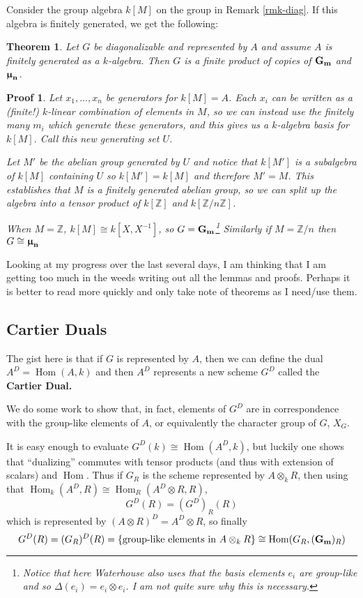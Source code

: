 \documentclass[12pt]{article}
\theoremstyle{nonumberbreak}
\theoremstyle{changebreak}
\newtheorem{thm}{Theorem}[subsection]
\theoremstyle{nonumberplain}
\newtheorem{prf}{Proof}
\theoremstyle{change}
\newcommand*{\bbZ}{\mathbb{Z}}
\DeclareMathOperator{\Hom}{Hom}
\newcommand*{\Gm}{\ensuremath\mathbf{G_m}}
\newcommand*{\mun}[1]{\ensuremath\mathbf{\bm\upmu_#1}}
\begin{document}
Consider the group algebra $k[M]$ on the group in Remark \ref{rmk-diag}. If this algebra
is finitely generated, we get the following:
\begin{thm}
	Let $G$ be diagonalizable and represented by $A$ and assume $A$ is finitely generated
	as a $k$-algebra. Then $G$ is a finite product of copies of $\Gm$ and $\mun n$.
\end{thm}
\begin{prf}
	Let $x_1,\dots, x_n$ be generators for $k[M]=A$. Each $x_i$ can be written as a (finite!)
	$k$-linear combination of elements in $M$, so we can instead use the finitely many $m_i$
	which generate these generators, and this gives us a $k$-algebra basis for $k[M]$. Call this
	new generating set $U$. 

	Let $M'$ be the abelian group generated by $U$ and notice that $k[M']$ is a subalgebra of
	$k[M]$ containing $U$ so $k[M']=k[M]$ and therefore $M'=M$. This establishes that $M$ is 
	a finitely generated abelian group, so we can split up the algebra into a tensor product
	of $k[\bbZ]$ and $k[\bbZ/n\bbZ]$.

	When $M=\bbZ$, $k[M]\cong k[X,X^{-1}]$, so $G= \Gm$\footnote{Notice that here Waterhouse also
	uses that the basis elements $e_i$ are group-like and so $\Delta(e_i)=e_i\otimes e_i$. I am not
	quite sure why this is necessary.} Similarly if $M=\bbZ/n$ then $G\cong \mun{n}$
\end{prf}

Looking at my progress over the last several days, I am thinking that I am getting
too much in the weeds writing out all the lemmas and proofs. Perhaps it is better to read more quickly
and only take note of theorems as I need/use them.

\subsection{Cartier Duals}
The gist here is that if $G$ is represented by $A$, then we can define the dual 
$A^D=\Hom(A,k)$ and then $A^D$ represents a new scheme $G^D$ called the \textbf{Cartier Dual.}

We do some work to show that, in fact, elements of $G^D$ are in correspondence with the 
group-like elements of $A$, or equivalently the character group of $G$, $X_G$.

It is easy enough to evaluate $G^D(k)\cong\Hom(A^D,k)$, but luckily one shows that
``dualizing'' commutes with tensor products (and thus with extension of scalars) and $\Hom$. Thus
if $G_R$ is the scheme represented by $A\otimes_k R$, then using that $\Hom_k(A^D,R)\cong\Hom_R(A^D\otimes R,R)$,
\[G^D(R)=(G^D)_R(R)\]
which is represented by $(A\otimes R)^D=A^D\otimes R$, so finally 
\[G^D(R)=(G_R)^D(R)=\{\text{group-like elements in }A\otimes_k R\}\cong \Hom(G_R,(\Gm)_R)\]
\end{document}
